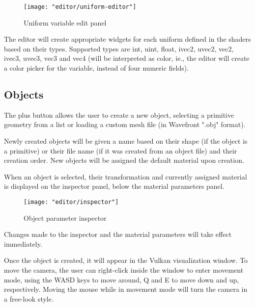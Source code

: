 \begin{figure}
    \centering
    \texttt{[image: "editor/uniform-editor"]}
    \caption{Uniform variable edit panel}
    \label{fig:uniform_editor}
\end{figure}

The editor will create appropriate widgets for each uniform defined in the shaders based on their types. Supported types are int, uint, float, ivec2, uvec2, vec2, ivec3, uvec3, vec3 and vec4 (will be interpreted as color, ie., the editor will create a color picker for the variable, instead of four numeric fields).

\subsection{Objects}

The plus button allows the user to create a new object, selecting a primitive geometry from a list or loading a custom mesh file (in Wavefront ".obj" format).

Newly created objects will be given a name based on their shape (if the object is a primitive) or their file name (if it was created from an object file) and their creation order. New objects will be assigned the default material upon creation.

When an object is selected, their transformation and currently assigned material is displayed on the inspector panel, below the material parameters panel.

\begin{figure}[h]
    \centering
    \texttt{[image: "editor/inspector"]}
    \caption{Object parameter inspector}
    \label{fig:inspector}
\end{figure}

Changes made to the inspector and the material parameters will take effect immediately.

Once the object is created, it will appear in the Vulkan visualization window. To move the camera, the user can right-click inside the window to enter movement mode, using the WASD keys to move around, Q and E to move down and up, respectively. Moving the mouse while in movement mode will turn the camera in a free-look style.
